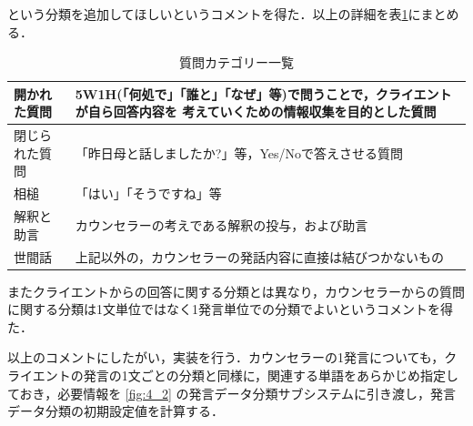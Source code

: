 \documentclass[shuuron]{kuee}
\begin{document}
という分類を追加してほしいというコメントを得た．以上の詳細を表\ref{table:queCate}にまとめる．
\begin{table}
  \caption{質問カテゴリー一覧}
  \label{table:queCate}
  \begin{center}
    \begin{tabular}{|l|p{7cm}|} \hline
      開かれた質問 & 5W1H(「何処で」「誰と」「なぜ」等)で問うことで，クライエントが自ら回答内容を
      考えていくための情報収集を目的とした質問
      \\ \hline
      閉じられた質問  & 「昨日母と話しましたか?」等，Yes/Noで答えさせる質問
      \\ \hline
      相槌 & 「はい」「そうですね」等
      \\ \hline
      解釈と助言  &  カウンセラーの考えである解釈の投与，および助言\\ \hline
      世間話 & 上記以外の，カウンセラーの発話内容に直接は結びつかないもの \\ \hline
    \end{tabular}
  \end{center}
\end{table}


またクライエントからの回答に関する分類とは異なり，カウンセラーからの質問に関する分類は1文単位ではなく1発言単位での分類でよいというコメントを得た．


以上のコメントにしたがい，実装を行う．カウンセラーの1発言についても，クライエントの発言の1文ごとの分類と同様に，関連する単語をあらかじめ指定しておき，必要情報を
\ref{fig:4_2}
の発言データ分類サブシステムに引き渡し，発言データ分類の初期設定値を計算する．
\end{document}

